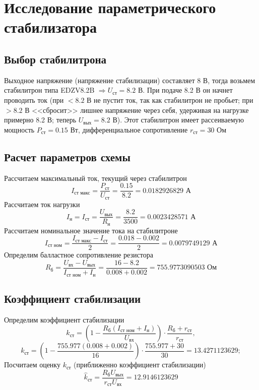 \documentclass[a4paper, 12pt]{article}
\begin{document}
    \section{Исследование параметрического стабилизатора}
    \subsection{Выбор стабилитрона}
    Выходное напряжение (напряжение стабилизации) составляет 8 В, тогда возьмем стабилитрон типа EDZV8.2B $\Rightarrow U_{\text{ст}}=8.2$ В.
    При подаче 8.2 В он начнет проводить ток (при $<8.2$ В не пустит ток, так как стабилитрон не пробьет; при $>8.2$ В <<сбросит>>
    лишнее напряжение через себя, удерживая на нагрузке примерно 8.2 В; теперь $U_{\text{вых}}=8.2$ В). Этот стабилитрон имеет рассеиваемую
    мощность $P_\text{ст}=0.15$ Вт, дифференциальное сопротивление $r_{\text{ст}}=30$ Ом
    
    
    \subsection{Расчет параметров схемы}
    Рассчитаем максимальный ток, текущий
    через стабилитрон
    $$
    I_{\text{ст макс}}=\dfrac{P_{\text{ст}}}{U_{\text{ст}}}=\dfrac{0.15}{8.2}=0.0182926829\text{ А}
    $$
    Рассчитаем ток нагрузки
    $$
    I_{\text{н}}=I_{\text{ст}}=\dfrac{U_{\text{вых}}}{R_{\text{н}}}=\dfrac{8.2}{3500}=0.0023428571\text{ А}
    $$
    Рассчитаем номинальное значение тока на стабилитроне
    $$
    I_{\text{ст ном}}=\dfrac{I_{\text{ст макс}}-I_{\text{ст}}}{2}=\dfrac{0.018-0.002}{2}=0.0079749129\text{ А}
    $$
    Определим балластное сопротивление резистора
    $$
    R_{\text{б}}=\dfrac{U_{\text{вх}}-U_{\text{вых}}}{I_{\text{ст ном}}+I_{\text{н}}}=\dfrac{16-8.2}{0.008+0.002}=755.9773090503\text{ Ом}
    $$


    \subsection{Коэффициент стабилизации}
    Определим коэффициент стабилизации
    $$
    k_{\text{ст}}=\left( 1-\dfrac{R_{\text{б}}\left( I_\text{ст ном}+I_{\text{н}} \right)}{U_{\text{вх}}} \right)\cdot\dfrac{R_{\text{б}}+r_{\text{ст}}}{r_{\text{ст}}},
    $$
    $$
    k_{\text{ст}}=\left( 1-\dfrac{755.977\left( 0.008+0.002 \right)}{16} \right)\cdot\dfrac{755.977+30}{30}=13.4271123629;
    $$
    Посчитаем оценку $k_{\text{ст}}$ (приближенно коэффициент стабилизации)
    $$
    \hat{k}_{\text{ст}}=\dfrac{R_{\text{б}}U_{\text{вых}}}{r_{\text{ст}}U_{\text{вх}}}=12.9146123629
    $$
\end{document}

